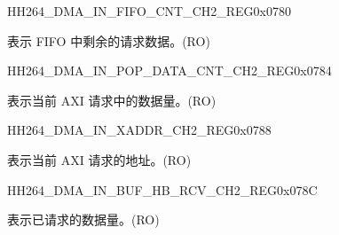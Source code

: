 \begin{register}{H}{H264\_DMA\_IN\_FIFO\_CNT\_CH2\_REG}{0x0780}\label{regdesc:H264DMAINFIFOCNTCH2REG}
%
%
\regnewline%
\begin{regdesc}\begin{reglist}
\label{fielddesc:H264DMAINCMDFIFOINFIFOCNTCH2}\item [H264\_DMA\_IN\_CMDFIFO\_INFIFO\_CNT\_CH2] 表示 FIFO 中剩余的请求数据。(RO)
\end{reglist}\end{regdesc}
\end{register}


\begin{register}{H}{H264\_DMA\_IN\_POP\_DATA\_CNT\_CH2\_REG}{0x0784}\label{regdesc:H264DMAINPOPDATACNTCH2REG}
%
%
\regnewline%
\begin{regdesc}\begin{reglist}
\label{fielddesc:H264DMAINCMDFIFOPOPDATACNTCH2}\item [H264\_DMA\_IN\_CMDFIFO\_POP\_DATA\_CNT\_CH2] 表示当前 AXI 请求中的数据量。(RO)
\end{reglist}\end{regdesc}
\end{register}


\begin{register}{H}{H264\_DMA\_IN\_XADDR\_CH2\_REG}{0x0788}\label{regdesc:H264DMAINXADDRCH2REG}
%
\regnewline%
\begin{regdesc}\begin{reglist}
\label{fielddesc:H264DMAINCMDFIFOXADDRCH2}\item [H264\_DMA\_IN\_CMDFIFO\_XADDR\_CH2] 表示当前 AXI 请求的地址。(RO)
\end{reglist}\end{regdesc}
\end{register}


\begin{register}{H}{H264\_DMA\_IN\_BUF\_HB\_RCV\_CH2\_REG}{0x078C}\label{regdesc:H264DMAINBUFHBRCVCH2REG}
%
%
\regnewline%
\begin{regdesc}\begin{reglist}
\label{fielddesc:H264DMAINCMDFIFOBUFHBRCVCH2}\item [H264\_DMA\_IN\_CMDFIFO\_BUF\_HB\_RCV\_CH2] 表示已请求的数据量。(RO)
\end{reglist}\end{regdesc}
\end{register}

